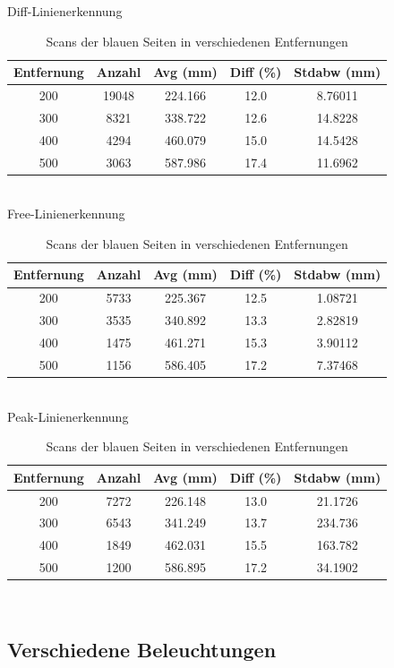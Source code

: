 \documentclass[ngerman,a4paper,parskip=half]{scrartcl}
\begin{document}
\begin{table}[H]
	\centering
	Diff-Linienerkennung \\
	\begin{tabular}{c|c|c|c|c}
		Entfernung & Anzahl & Avg (mm) & Diff (\%) & Stdabw (mm) \\ \hline
		200 & 19048 & 224.166 & 12.0 & 8.76011 \\
		300 & 8321 & 338.722 & 12.6 & 14.8228 \\
		400 & 4294 & 460.079 & 15.0 & 14.5428 \\
		500 & 3063 & 587.986 & 17.4 & 11.6962 \\
	\end{tabular} \\
	\vspace{1em}
	Free-Linienerkennung \\
		\begin{tabular}{c|c|c|c|c}
		Entfernung & Anzahl & Avg (mm) & Diff (\%) & Stdabw (mm) \\ \hline
		200 & 5733 & 225.367 & 12.5 & 1.08721 \\
		300 & 3535 & 340.892 & 13.3 & 2.82819 \\
		400 & 1475 & 461.271 & 15.3 & 3.90112 \\
		500 & 1156 & 586.405 & 17.2 & 7.37468 \\
	\end{tabular} \\
	\vspace{1em}
	Peak-Linienerkennung \\
		\begin{tabular}{c|c|c|c|c}
		Entfernung & Anzahl & Avg (mm) & Diff (\%) & Stdabw (mm) \\ \hline
		200 & 7272 & 226.148 & 13.0 & 21.1726 \\
		300 & 6543 & 341.249 & 13.7 & 234.736 \\
		400 & 1849 & 462.031 & 15.5 & 163.782 \\
		500 & 1200 & 586.895 & 17.2 & 34.1902 \\
	\end{tabular} \\
	\caption{Scans der blauen Seiten in verschiedenen Entfernungen}
	\label{tab:dists}
\end{table}

\subsection{Verschiedene Beleuchtungen}
\end{document}
